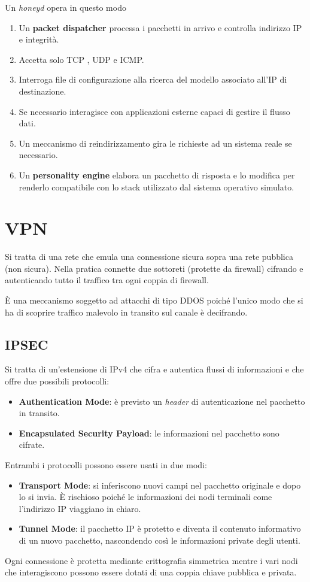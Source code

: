 Un \emph{honeyd} opera in questo modo
\begin{enumerate}
	\item Un \textbf{packet dispatcher} processa i pacchetti in arrivo e controlla indirizzo IP e integrità.
	\item Accetta solo TCP , UDP e ICMP.
	\item Interroga file di configurazione alla ricerca del modello associato all'IP di destinazione.
	\item Se necessario interagisce con applicazioni esterne capaci di gestire il flusso dati.
	\item Un meccanismo di reindirizzamento gira le richieste ad un sistema reale se necessario.
	\item Un \textbf{personality engine} elabora un pacchetto di risposta e lo modifica per renderlo compatibile con
	      lo stack utilizzato dal sistema operativo simulato.
\end{enumerate}

\section{VPN}
Si tratta di una rete che emula una connessione sicura sopra una rete pubblica (non sicura). Nella pratica connette
due sottoreti (protette da firewall) cifrando e autenticando tutto il traffico tra ogni coppia di firewall.

\`E una meccanismo soggetto ad attacchi di tipo DDOS poiché l'unico modo che si ha di scoprire traffico malevolo
in transito sul canale è decifrando.

\subsection{IPSEC}
Si tratta di un'estensione di IPv4 che cifra e autentica flussi di informazioni e che offre due possibili protocolli:
\begin{itemize}
	\item \textbf{Authentication Mode}: è previsto un \emph{header} di autenticazione nel pacchetto in transito.
	\item \textbf{Encapsulated Security Payload}: le informazioni nel pacchetto sono cifrate.
\end{itemize}
Entrambi i protocolli possono essere usati in due modi:
\begin{itemize}
	\item \textbf{Transport Mode}: si inferiscono nuovi campi nel pacchetto originale e dopo lo si invia. \`E
	      rischioso poiché le informazioni dei nodi terminali come l'indirizzo IP viaggiano in chiaro.
	\item \textbf{Tunnel Mode}: il pacchetto IP è protetto e diventa il contenuto informativo di un nuovo pacchetto,
	      nascondendo così le informazioni private degli utenti.
\end{itemize}
Ogni connessione è protetta mediante crittografia simmetrica mentre i vari nodi che interagiscono possono essere
dotati di una coppia chiave pubblica e privata.

